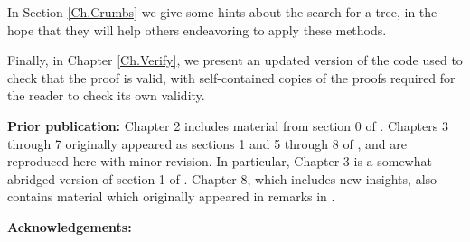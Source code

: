 In Section \ref{Ch.Crumbs} we give some hints about the search for a tree,
in the hope that they will help others endeavoring to apply these methods.

Finally, in Chapter \ref{Ch.Verify}, we present an updated version of
the code used to check that the proof is valid,
with self-contained copies of the proofs required for the reader
to check its own validity.
\vskip 8pt

\noindent\textbf {Prior publication:} Chapter 2 includes material from section 0 of \cite{GMT}.
Chapters 3 through 7 originally appeared as sections 1 and 5 through 8 of \cite{GMT},
and are reproduced here with minor revision.  In particular, Chapter 3 is a somewhat abridged version of section 1 of \cite{GMT}.
Chapter 8, which includes new insights, also contains material which originally appeared in remarks in \cite{GMT}.

\vskip 8pt

\noindent\textbf {Acknowledgements:}
